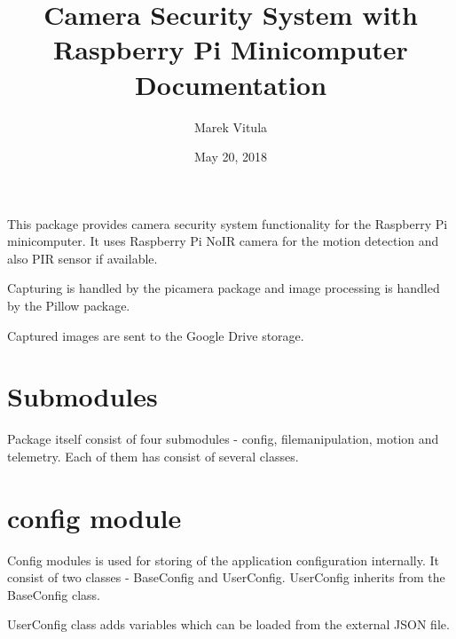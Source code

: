 \documentclass[letterpaper,10pt,english]{sphinxmanual}
\title{Camera Security System with Raspberry Pi Minicomputer Documentation}
\date{May 20, 2018}
\author{Marek Vitula}
\begin{document}
\maketitle
\tableofcontents
{}\label{rpicameramon::doc}


This package provides camera security system functionality for the Raspberry Pi minicomputer.
It uses Raspberry Pi NoIR camera for the motion detection and also PIR sensor if available.

Capturing is handled by the picamera package and image processing is handled by the Pillow package.

Captured images are sent to the Google Drive storage.


\chapter{Submodules}
\label{rpicameramon:rpicameramon-package}\label{rpicameramon:submodules}
Package itself consist of four submodules - config, filemanipulation, motion and telemetry.
Each of them has consist of several classes.


\chapter{config module}
\label{rpicameramon:config-module}
Config modules is used for storing of the application configuration internally.
It consist of two classes - BaseConfig and UserConfig. UserConfig inherits from the BaseConfig class.

UserConfig class adds variables which can be loaded from the external JSON file.
\label{rpicameramon:module-rpicameramon.config}
\end{document}
